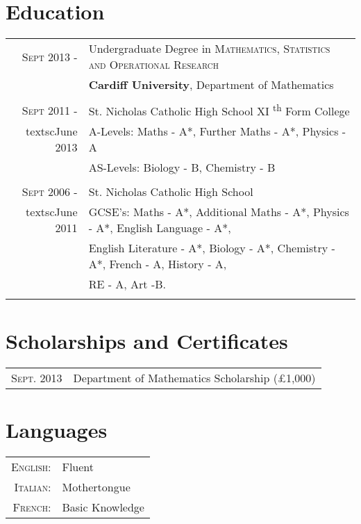 \documentclass[a4paper,10pt]{article} %
\begin{document}
\section{Education}
\begin{tabular}{rl}

\textsc{Sept} 2013 - & Undergraduate Degree in \textsc{}\textsc{Mathematics, Statistics and Operational Research} \\
&\normalsize\textbf{Cardiff University}, Department of Mathematics\\
\\
\textsc{Sept} 2011 - & St. Nicholas Catholic High School XI \textsuperscript{th} Form College\\
textsc{June} 2013 & A-Levels: Maths - A*, Further Maths - A*, Physics - A\\
& AS-Levels: Biology - B, Chemistry - B\\
\\
\textsc{Sept} 2006 - & St. Nicholas Catholic High School\\
textsc{June} 2011 & GCSE's: Maths - A*, Additional Maths - A*, Physics - A*, English Language - A*,\\
& English Literature - A*, Biology - A*, Chemistry - A*, French - A, History - A,\\
& RE - A, Art -B.\\
\\

\end{tabular}
\section{Scholarships and Certificates}
\begin{tabular}{rl}

\textsc{Sept.} 2013 & Department of Mathematics Scholarship (\pounds1,000)\\

\end{tabular}
\section{Languages}
\begin{tabular}{rl}

\textsc{English:} & Fluent\\
\textsc{Italian:} & Mothertongue\\
\textsc{French:} & Basic Knowledge\\

\end{tabular}
\end{document}
